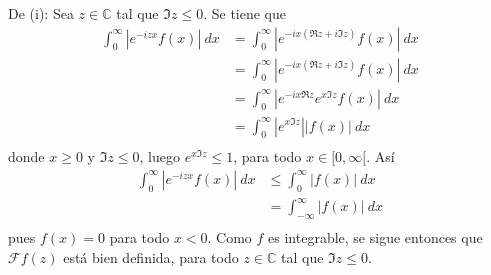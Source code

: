 \documentclass[12pt]{report}
\theoremstyle{largebreak}
\renewcommand{\leq}{\ensuremath{\leqslant}}
\renewcommand{\geq}{\ensuremath{\geqslant}}
\newcommand\abs[1]{\ensuremath{\left|#1\right|}}
\newcommand{\fou}[1]{\ensuremath{\mathcal{F}#1}}
\begin{document}
    \begin{sol}
        De (i): Sea $z\in\mathbb{C}$ tal que $\Im z\leq0$. Se tiene que
        \begin{equation*}
            \begin{split}
                \int_0^{\infty}\abs{e^{ -izx}f(x)}\:dx&=\int_0^{\infty}\abs{e^{ -ix(\Re z+i\Im z)}f(x)}\:dx\\
                &=\int_0^{\infty}\abs{e^{ -ix(\Re z+i\Im z)}f(x)}\:dx\\
                &=\int_0^{\infty}\abs{e^{ -ix\Re z}e^{ x\Im z}f(x)}\:dx\\
                &=\int_0^{\infty}\abs{e^{x\Im z}}\abs{f(x)}\:dx\\
            \end{split}
        \end{equation*}
        donde $x\geq 0$ y $\Im z\leq0$, luego $e^{x\Im z}\leq1$, para todo $x\in [0,\infty[$. Así
        \begin{equation*}
            \begin{split}
                \int_0^{\infty}\abs{e^{ -izx}f(x)}\:dx&\leq\int_0^{\infty}\abs{f(x)}\:dx\\
                &=\int_{-\infty}^\infty\abs{f(x)}\:dx\\
            \end{split}
        \end{equation*}
        pues $f(x)=0$ para todo $x<0$. Como $f$ es integrable, se sigue entonces que $\fou{f}(z)$ está bien definida, para todo $z\in\mathbb{C}$ tal que $\Im z\leq0$.


\end{sol}
\end{document}
